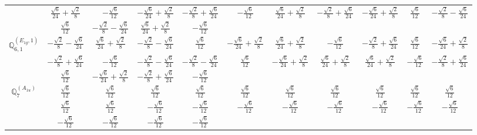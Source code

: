 \documentclass[fleqn,10pt,landscape]{article}
\begin{document}
\begin{itemize}
{\begin{center}
\begin{longtable}{ccccccccccc}
& $ \frac{\sqrt{6}}{24} + \frac{\sqrt{2}}{8} $ & $ - \frac{\sqrt{6}}{12} $ & $ - \frac{\sqrt{6}}{24} + \frac{\sqrt{2}}{8} $ & $ - \frac{\sqrt{2}}{8} + \frac{\sqrt{6}}{24} $ & $ - \frac{\sqrt{6}}{12} $ & $ \frac{\sqrt{6}}{24} + \frac{\sqrt{2}}{8} $ & $ - \frac{\sqrt{2}}{8} + \frac{\sqrt{6}}{24} $ & $ - \frac{\sqrt{6}}{24} + \frac{\sqrt{2}}{8} $ & $ \frac{\sqrt{6}}{12} $ & $ - \frac{\sqrt{2}}{8} - \frac{\sqrt{6}}{24} $ \\
& $ \frac{\sqrt{6}}{12} $ & $ - \frac{\sqrt{2}}{8} - \frac{\sqrt{6}}{24} $ & $ \frac{\sqrt{6}}{24} + \frac{\sqrt{2}}{8} $ & $ - \frac{\sqrt{6}}{12} $ & $  $ & $  $ & $  $ & $  $ & $  $ & $  $ \\ \hline
$\mathbb{Q}_{6,1}^{(E_{1g},1)}$ & $ - \frac{\sqrt{2}}{8} - \frac{\sqrt{6}}{24} $ & $ \frac{\sqrt{6}}{24} + \frac{\sqrt{2}}{8} $ & $ - \frac{\sqrt{2}}{8} - \frac{\sqrt{6}}{24} $ & $ \frac{\sqrt{6}}{12} $ & $ - \frac{\sqrt{6}}{24} + \frac{\sqrt{2}}{8} $ & $ \frac{\sqrt{6}}{24} + \frac{\sqrt{2}}{8} $ & $ - \frac{\sqrt{6}}{12} $ & $ - \frac{\sqrt{2}}{8} + \frac{\sqrt{6}}{24} $ & $ \frac{\sqrt{6}}{12} $ & $ - \frac{\sqrt{6}}{24} + \frac{\sqrt{2}}{8} $ \\
& $ - \frac{\sqrt{2}}{8} + \frac{\sqrt{6}}{24} $ & $ - \frac{\sqrt{6}}{12} $ & $ - \frac{\sqrt{2}}{8} - \frac{\sqrt{6}}{24} $ & $ - \frac{\sqrt{2}}{8} - \frac{\sqrt{6}}{24} $ & $ \frac{\sqrt{6}}{12} $ & $ - \frac{\sqrt{6}}{24} + \frac{\sqrt{2}}{8} $ & $ \frac{\sqrt{6}}{24} + \frac{\sqrt{2}}{8} $ & $ \frac{\sqrt{6}}{24} + \frac{\sqrt{2}}{8} $ & $ - \frac{\sqrt{6}}{12} $ & $ - \frac{\sqrt{2}}{8} + \frac{\sqrt{6}}{24} $ \\
& $ \frac{\sqrt{6}}{12} $ & $ - \frac{\sqrt{6}}{24} + \frac{\sqrt{2}}{8} $ & $ - \frac{\sqrt{2}}{8} + \frac{\sqrt{6}}{24} $ & $ - \frac{\sqrt{6}}{12} $ & $  $ & $  $ & $  $ & $  $ & $  $ & $  $ \\ \hline
$\mathbb{Q}_{7}^{(A_{1u})}$ & $ \frac{\sqrt{6}}{12} $ & $ \frac{\sqrt{6}}{12} $ & $ \frac{\sqrt{6}}{12} $ & $ \frac{\sqrt{6}}{12} $ & $ \frac{\sqrt{6}}{12} $ & $ \frac{\sqrt{6}}{12} $ & $ \frac{\sqrt{6}}{12} $ & $ \frac{\sqrt{6}}{12} $ & $ \frac{\sqrt{6}}{12} $ & $ \frac{\sqrt{6}}{12} $ \\
& $ \frac{\sqrt{6}}{12} $ & $ \frac{\sqrt{6}}{12} $ & $ - \frac{\sqrt{6}}{12} $ & $ - \frac{\sqrt{6}}{12} $ & $ - \frac{\sqrt{6}}{12} $ & $ - \frac{\sqrt{6}}{12} $ & $ - \frac{\sqrt{6}}{12} $ & $ - \frac{\sqrt{6}}{12} $ & $ - \frac{\sqrt{6}}{12} $ & $ - \frac{\sqrt{6}}{12} $ \\
& $ - \frac{\sqrt{6}}{12} $ & $ - \frac{\sqrt{6}}{12} $ & $ - \frac{\sqrt{6}}{12} $ & $ - \frac{\sqrt{6}}{12} $ & $  $ & $  $ & $  $ & $  $ & $  $ & $  $ \\
\end{longtable}
\end{center}
}
\end{itemize}
\end{document}
